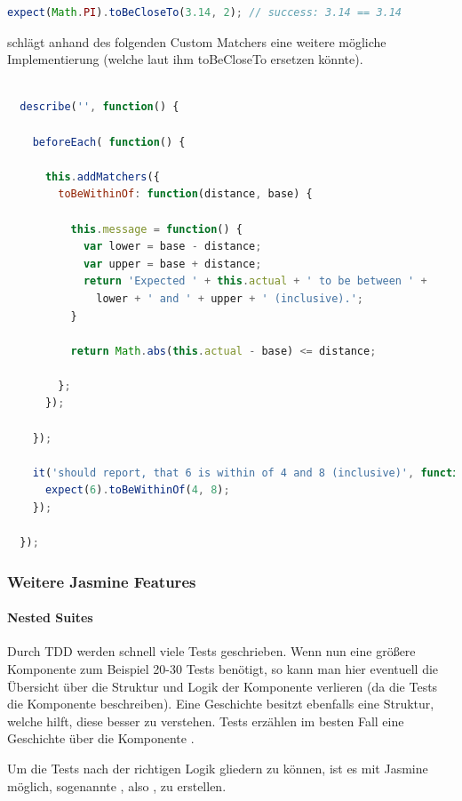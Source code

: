 \begin{lstlisting}[language=JavaScript]
expect(Math.PI).toBeCloseTo(3.14, 2); // success: 3.14 == 3.14
\end{lstlisting}

\cite[21]{Hahn:2013} schlägt anhand des folgenden Custom Matchers eine weitere mögliche Implementierung (welche laut ihm toBeCloseTo ersetzen könnte).

\begin{lstlisting}[language=JavaScript]

  describe('', function() {

    beforeEach( function() {

      this.addMatchers({
        toBeWithinOf: function(distance, base) {

          this.message = function() {
            var lower = base - distance;
            var upper = base + distance;
            return 'Expected ' + this.actual + ' to be between ' + 
              lower + ' and ' + upper + ' (inclusive).';
          }

          return Math.abs(this.actual - base) <= distance;

        };
      });

    });

    it('should report, that 6 is within of 4 and 8 (inclusive)', function() {
      expect(6).toBeWithinOf(4, 8);
    });

  });

\end{lstlisting} 

\subsubsection{Weitere Jasmine Features}
\paragraph{Nested Suites}
Durch TDD werden schnell viele Tests geschrieben. Wenn nun eine größere Komponente zum Beispiel 20-30 Tests benötigt, so kann man hier eventuell die Übersicht über die Struktur und Logik der Komponente verlieren (da die Tests die Komponente beschreiben). Eine Geschichte besitzt ebenfalls eine Struktur, welche hilft, diese besser zu verstehen. Tests erzählen im besten Fall eine Geschichte über die Komponente \autocite{Beck:2003}.

Um die Tests nach der richtigen Logik gliedern zu können, ist es mit Jasmine möglich, sogenannte , also , zu erstellen.

